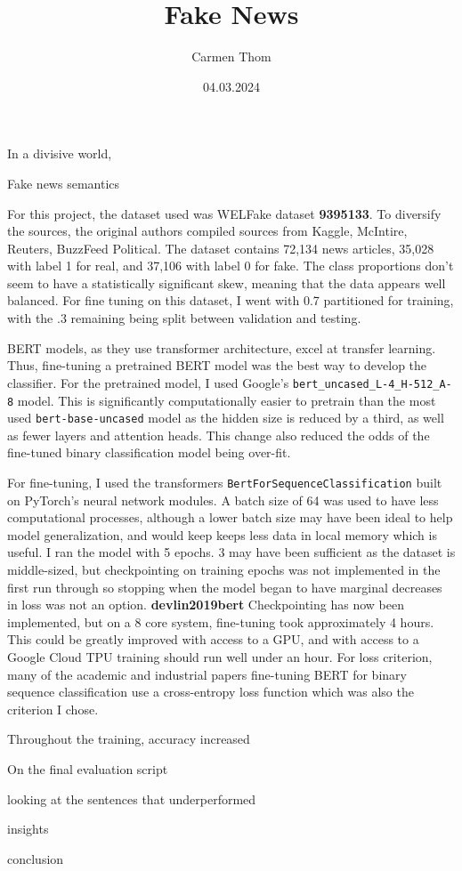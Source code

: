 \documentclass[12pt]{article}
\title{Fake News}
\author{Carmen Thom}
\date{04.03.2024}
\begin{document}
\maketitle


In a divisive world, 

Fake news semantics

For this project, the dataset used was WELFake dataset \textbf{9395133}. To diversify the sources, the original authors compiled sources from Kaggle, McIntire, Reuters, BuzzFeed Political. The dataset contains 72,134 news articles, 35,028 with label 1 for real, and 37,106 with label 0 for fake. The class proportions don't seem to have a statistically significant skew, meaning that the data appears well balanced. For fine tuning on this dataset, I went with 0.7 partitioned for training, with the .3 remaining being split between validation and testing. 

BERT models, as they use transformer architecture, excel at transfer learning. Thus, fine-tuning a pretrained BERT model was the best way to develop the classifier. For the pretrained model, I used Google's \verb|bert_uncased_L-4_H-512_A-8| model. This is significantly computationally easier to pretrain than the most used \verb|bert-base-uncased| model as the hidden size is reduced by a third, as well as fewer layers and attention heads. This change also reduced the odds of the fine-tuned binary classification model being over-fit. 

For fine-tuning, I used the transformers \verb|BertForSequenceClassification| built on PyTorch's neural network modules. A batch size of 64 was used to have less computational processes, although a lower batch size may have been ideal to help model generalization, and would keep keeps less data in local memory which is useful. I ran the model with 5 epochs. 3 may have been sufficient as the dataset is middle-sized, but checkpointing on training epochs was not implemented in the first run through so stopping when the model began to have marginal decreases in loss was not an option. \textbf{devlin2019bert} Checkpointing has now been implemented, but on a 8 core system, fine-tuning took approximately 4 hours. This could be greatly improved with access to a GPU, and with access to a Google Cloud TPU training should run well under an hour. For loss criterion, many of the academic and industrial papers fine-tuning BERT for binary sequence classification use a cross-entropy loss function which was also the criterion I chose. 

Throughout the training, accuracy increased 

On the final evaluation script

looking at the sentences that underperformed

insights

conclusion
\end{document}
